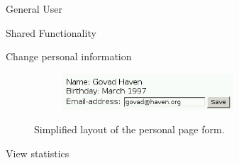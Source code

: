 \begin{section}{General User}
\begin{subsection}{Shared Functionality}
\begin{subsubsection}{Change personal information}
\begin{figure}
                \begin{subfigure}{0.3\textwidth}
                    \includegraphics[width=0.7\textwidth]{img/personal_e.png}
                    \label{img:personal_edit}
                \end{subfigure}
                \caption{Simplified layout of the personal page form.}
            \end{figure}
        \end{subsubsection}

        \begin{subsubsection}{View statistics}
        \end{subsubsection}

    \end{subsection}

\end{section}



